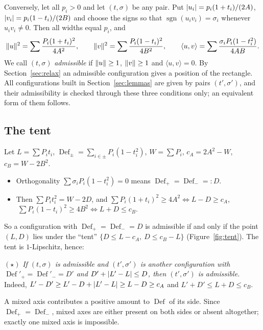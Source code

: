 \documentclass[11pt]{article}
\theoremstyle{definition}
\theoremstyle{remark}
\newcommand{\Def}{\operatorname{Def}}
\newcommand{\sgn}{\operatorname{sgn}}
\DeclarePairedDelimiter{\abs}{\lvert}{\rvert}
\DeclarePairedDelimiter{\norm}{\lVert}{\rVert}
\begin{document}
Conversely, let all $p_i>0$ and let $(t,\sigma)$ be any pair. Put $\abs{u_i}=p_i(1+t_i)/(2A)$,
$\abs{v_i}=p_i(1-t_i)/(2B)$ and choose the signs so that $\sgn(u_iv_i)=\sigma_i$ whenever $u_iv_i\ne0$.
Then all widths equal $p_i$, and
\[
\norm u^2=\sum\frac{P_i(1+t_i)^2}{4A^2},\qquad \norm v^2=\sum\frac{P_i(1-t_i)^2}{4B^2},\qquad
\langle u,v\rangle=\sum\frac{\sigma_iP_i(1-t_i^2)}{4AB}.
\]
We call $(t,\sigma)$ \emph{admissible} if $\norm u\ge1$, $\norm v\ge1$ and $\langle u,v\rangle=0$. By
Section~\ref{sec:relax} an admissible configuration gives a position of the rectangle. All configurations
built in Section~\ref{sec:lemmas} are given by pairs $(t',\sigma')$, and their admissibility is checked
through these three conditions only; an equivalent form of them follows.

\subsection{The tent}\label{sec:tent}
Let $L=\sum P_it_i$, $\Def_\pm=\sum_{i\in\pm}P_i(1-t_i^2)$, $W=\sum P_i$, $c_A=2A^2-W$, $c_B=W-2B^2$.
\begin{itemize}
\item Orthogonality $\sum\sigma_iP_i(1-t_i^2)=0$ means $\Def_+=\Def_-=:D$.
\item Then $\sum P_it_i^2=W-2D$, and
$\sum P_i(1+t_i)^2\ge4A^2\iff L-D\ge c_A$, $\ \sum P_i(1-t_i)^2\ge4B^2\iff L+D\le c_B$.
\end{itemize}
So a configuration with $\Def_+=\Def_-=D$ is admissible if and only if the point $(L,D)$ lies under the
``tent'' $\{D\le L-c_A,\ D\le c_B-L\}$ (Figure~\ref{fig:tent}). The tent is $1$-Lipschitz, hence:

\medskip\noindent$(\star)$ \emph{If $(t,\sigma)$ is admissible and $(t',\sigma')$ is another configuration
with $\Def'_+=\Def'_-=D'$ and $D'+\abs{L'-L}\le D$, then $(t',\sigma')$ is admissible.}
Indeed, $L'-D'\ge L'-D+\abs{L'-L}\ge L-D\ge c_A$ and $L'+D'\le L+D\le c_B$.

\medskip
A mixed axis contributes a positive amount to $\Def$ of its side. Since $\Def_+=\Def_-$, mixed axes
are either present on both sides or absent altogether; exactly one mixed axis is impossible.
\end{document}
